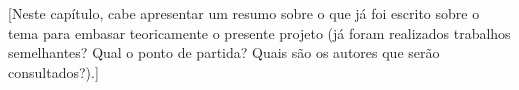 [Neste capítulo, cabe apresentar um resumo sobre o que já foi escrito sobre o tema para embasar teoricamente o presente projeto (já foram realizados trabalhos semelhantes? Qual o ponto de partida? Quais são os autores que serão consultados?).]
